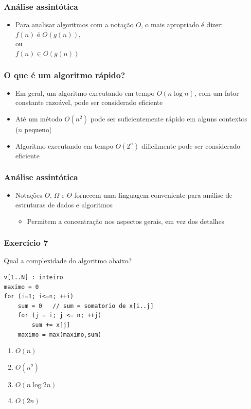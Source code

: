 \documentclass[aspectratio=169]{beamer}
\begin{document}
\begin{frame}\frametitle{Análise assintótica}
\begin{itemize}
	\item Para analisar algoritmos com a notação $O$, o mais apropriado é dizer:\\
$f(n)$ é $O(g(n))$,\\
ou\\
$f(n) \in O(g(n))$
\end{itemize}
\end{frame}

\begin{frame}\frametitle{O que é um algoritmo rápido?}
\begin{itemize}
	\item Em geral, um algoritmo executando em tempo $O(n\log{n})$, com um fator constante razoável, pode ser considerado eficiente
	\item Até um método $O(n^2)$ pode ser suficientemente rápido em alguns contextos ($n$ pequeno)
	\item Algoritmo executando em tempo $O(2^n)$ dificilmente pode ser considerado eficiente
\end{itemize}
\end{frame}

\begin{frame}\frametitle{Análise assintótica}
\begin{itemize}
	\item Notações $O$, $\Omega$ e $\Theta$ fornecem uma linguagem conveniente para análise de estruturas de dados e algoritmos
	\begin{itemize}
		\item Permitem a concentração nos aspectos gerais, em vez dos detalhes
	\end{itemize}
\end{itemize}
\end{frame}

\begin{frame}[fragile]\frametitle{Exercício 7} %
Qual a complexidade do algoritmo abaixo?
{\scriptsize
\begin{verbatim}
v[1..N] : inteiro
maximo = 0
for (i=1; i<=n; ++i)
    sum = 0   // sum = somatorio de x[i..j]
    for (j = i; j <= n; ++j)
        sum += x[j]
    maximo = max(maximo,sum)
\end{verbatim}
}
\begin{enumerate}[A]
	\item $O(n)$
	\item $O(n^2)$ %
	\item $O(n \log 2n)$
	\item $O(2n)$
\end{enumerate}
\end{frame}
\end{document}
